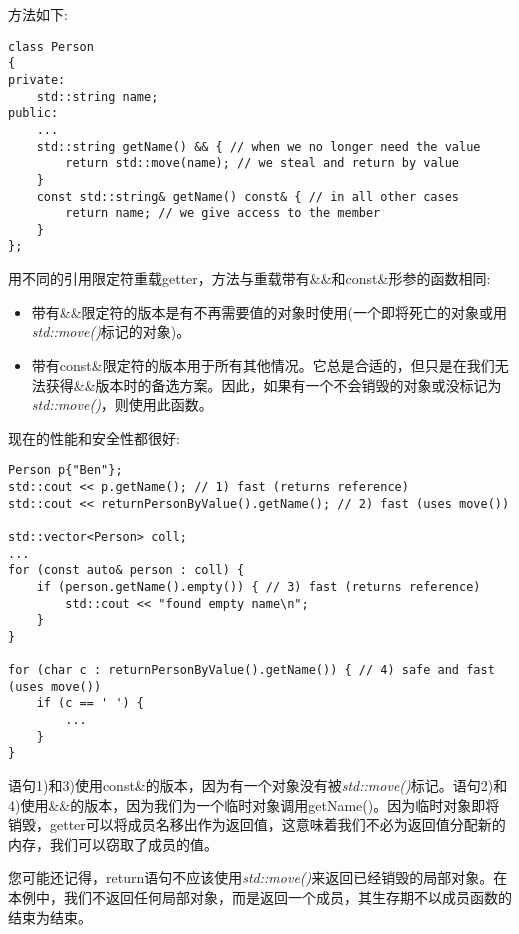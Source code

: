 方法如下:\par

\begin{lstlisting}[caption={}]
class Person
{
private:
	std::string name;
public:
	...
	std::string getName() && { // when we no longer need the value
		return std::move(name); // we steal and return by value
	}
	const std::string& getName() const& { // in all other cases
		return name; // we give access to the member
	}
};
\end{lstlisting}

用不同的引用限定符重载getter，方法与重载带有\&\&和const\&形参的函数相同:\par

\begin{itemize}
	\item 带有\&\&限定符的版本是有不再需要值的对象时使用(一个即将死亡的对象或用\textit{std::move()}标记的对象)。
	\item 带有const\&限定符的版本用于所有其他情况。它总是合适的，但只是在我们无法获得\&\&版本时的备选方案。因此，如果有一个不会销毁的对象或没标记为\textit{std::move()}，则使用此函数。
\end{itemize}

现在的性能和安全性都很好:\par

\begin{lstlisting}[caption={}]
Person p{"Ben"};
std::cout << p.getName(); // 1) fast (returns reference)
std::cout << returnPersonByValue().getName(); // 2) fast (uses move())

std::vector<Person> coll;
...
for (const auto& person : coll) {
	if (person.getName().empty()) { // 3) fast (returns reference)
		std::cout << "found empty name\n";
	}
}

for (char c : returnPersonByValue().getName()) { // 4) safe and fast (uses move())
	if (c == ' ') {
		...
	}
}
\end{lstlisting}

语句1)和3)使用const\&的版本，因为有一个对象没有被\textit{std::move()}标记。语句2)和4)使用\&\&的版本，因为我们为一个临时对象调用getName()。因为临时对象即将销毁，getter可以将成员名移出作为返回值，这意味着我们不必为返回值分配新的内存，我们可以窃取了成员的值。\par

您可能还记得，return语句不应该使用\textit{std::move()}来返回已经销毁的局部对象。在本例中，我们不返回任何局部对象，而是返回一个成员，其生存期不以成员函数的结束为结束。\par

